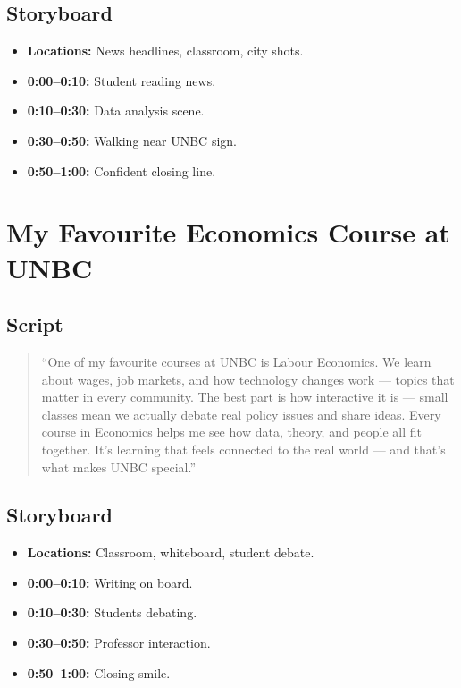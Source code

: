 \documentclass[12pt]{article}
\begin{document}
\subsection*{Storyboard}
\begin{itemize}[leftmargin=*]
    \item \textbf{Locations:} News headlines, classroom, city shots.
    \item \textbf{0:00–0:10:} Student reading news.
    \item \textbf{0:10–0:30:} Data analysis scene.
    \item \textbf{0:30–0:50:} Walking near UNBC sign.
    \item \textbf{0:50–1:00:} Confident closing line.
\end{itemize}

\section{My Favourite Economics Course at UNBC}

\subsection*{Script}
\begin{quote}
``One of my favourite courses at UNBC is Labour Economics. 
We learn about wages, job markets, and how technology changes work — topics that matter in every community. 
The best part is how interactive it is — small classes mean we actually debate real policy issues and share ideas. 
Every course in Economics helps me see how data, theory, and people all fit together. 
It’s learning that feels connected to the real world — and that’s what makes UNBC special.''
\end{quote}

\subsection*{Storyboard}
\begin{itemize}[leftmargin=*]
    \item \textbf{Locations:} Classroom, whiteboard, student debate.
    \item \textbf{0:00–0:10:} Writing on board.
    \item \textbf{0:10–0:30:} Students debating.
    \item \textbf{0:30–0:50:} Professor interaction.
    \item \textbf{0:50–1:00:} Closing smile.
\end{itemize}
\end{document}
